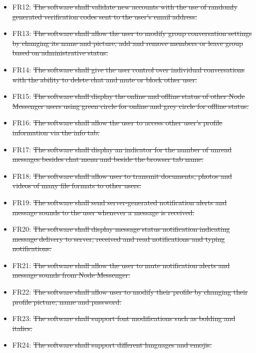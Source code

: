 \documentclass[12pt, titlepage]{article}
\begin{document}
	    \begin{itemize}
			\item FR12: \sout{The software shall validate new accounts with the use of randomly generated verification codes sent to the user's email address.}
			\item FR13: \sout{The software shall allow the user to modify group conversation settings by changing its name and picture, add and remove members or leave group based on administrative status.}	
			
			\item FR14: \sout{The software shall give the user control over individual conversations with the ability to delete chat and mute or block other user.}

		    \item FR15: \sout{The software shall display the online and offline status of other Node Messenger users using green circle for online and grey circle for offline status.}

		    \item FR16: \sout{The software shall allow the user to access other user's profile information via the info tab.}

		    \item FR17: \sout{The software shall display an indicator for the number of unread messages besides chat menu and beside the browser tab name.}
		    \item FR18: \sout{The software shall allow user to transmit documents, photos and videos of many file formats to other users.}
		    \item FR19: \sout{The software shall send server-generated notification alerts and message sounds to the user whenever a message is received.}
		    \item FR20: \sout{The software shall display message status notification indicating message delivery to server, received and read notifications and typing notifications.}
		    \item FR21: \sout{The software shall allow the user to mute notification alerts and message sounds from Node Messenger.}
		    \item FR22: \sout{The software shall allow user to modify their profile by changing their profile picture, name and password.}
		    \item FR23: \sout{The software shall support font modifications such as bolding and italics.}
		    \item FR24: \sout{The software shall support different languages and emojis.}
		\end{itemize}	
			
\end{document}
